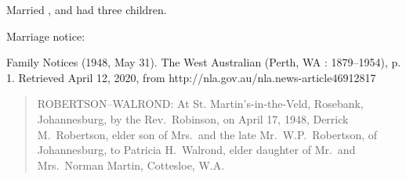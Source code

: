 
Married , and had three children.

Marriage notice:

Family Notices (1948, May 31). The West Australian (Perth, WA : 1879--1954), p. 1.
Retrieved April 12, 2020, from http://nla.gov.au/nla.news-article46912817

\begin{quotation}
ROBERTSON--WALROND: At St. Martin's-in-the-Veld, Rosebank, Johannesburg,
by the Rev.\ Robinson, on April 17, 1948,
Derrick M.\ Robertson, elder son of Mrs.\ and the late Mr.\ W.P.\ Robertson, of Johannesburg,
to Patricia H.\ Walrond, elder daughter of Mr.\ and Mrs.\ Norman Martin, Cottesloe, W.A.
\end{quotation}
